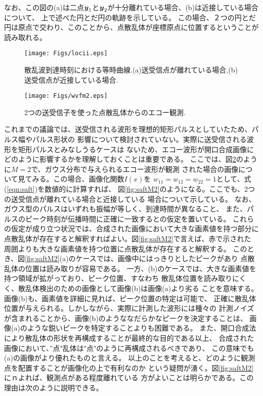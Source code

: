 \documentclass[10pt,a4j,dvipdfmx]{jarticle}
\begin{document}
なお、この図の(a)は二点$\mbox{\boldmath $y$}_1$と$\mbox{\boldmath $y$}_2$が十分離れている場合、(b)は近接している場合について、
上で述べた円とだ円の軌跡を示している。
この場合、２つの円とだ円は原点で交わり、このことから、点散乱体が座標原点に位置するということが読み取れる。
\begin{figure}[h]
	\begin{center}
	\texttt{[image: Figs/locii.eps]} 
	\end{center}
	\caption{散乱波到達時刻における等時曲線.(a)送受信点が離れている場合,(b)送受信点が近接している場合.} 
	\label{fig:locii}
\end{figure}
\begin{figure}[h]
	\begin{center}
	\texttt{[image: Figs/wvfm2.eps]} 
	\end{center}
	\caption{2つの送受信子を使った点散乱体からのエコー観測.} 
	\label{fig:wvfm2}
\end{figure}
これまでの議論では、送受信される波形を理想的矩形パルスとしていたため、パルス幅やパルス形状の
影響について検討されていない。実際に送受信される波形を矩形パルスとみなしうるケースは
ないため、エコー波形が開口合成画像にどのように影響するかを理解しておくことは重要である。
ここでは、図\ref{fig:wvfm2}のように$M=2$で、ガウス分布で与えられるエコー波形が観測
された場合の画像について見てみる。この場合、画像化関数$I(x)$を
$w_{11}=w_{12}=w_{22}=1$として、式(\ref{eqn:saft})を数値的に計算すれば、
図\ref{fig:saftM2}のようになる。ここでも、2つの送受信点が離れている場合と近接している
場合について示している。
なお、ガウス型のパルスはいずれも振幅が等しく、到達時間が異なること、
また、パルスのピーク時刻が伝播時間に正確に一致するとの仮定を置いている。
これらの仮定が成り立つ状況では、合成された画像において大きな画素値を持つ部分に
点散乱体が存在すると解釈すればよい。図\ref{fig:saftM2}で言えば、赤で示された
周囲よりも大きな画素値を持つ位置に点散乱体が存在すると解釈する。
このとき、図\ref{fig:saftM2}(a)のケースでは、画像中にはっきりとしたピークがあり
点散乱体の位置は読み取りが容易である。
一方、(b)のケースでは、大きな画素値を持つ領域が拡がっており、ピーク位置、すなわち
散乱体位置を読み取りにくく、散乱体検出のための画像として画像(b)は画像(a)より劣る
ことを意味する。画像(b)も、画素値を詳細に見れば、ピーク位置の特定は可能で、
正確に散乱体位置が与えられる。しかしながら、実際に計測した波形には種々の
計測ノイズが含まれることから、画像(b)のようななだらかなピークを決定することは、
画像(a)のような鋭いピークを特定することよりも困難である。
また、開口合成法により散乱体の形状を再構成することが最終的な目的である以上、
合成された画像において、”点"乱体は"点"のように再構成されるべきであり、
この意味でも(a)の画像がより優れたものと言える。
以上のことを考えると、どのように観測点を配置することが画像化の上で有利なのか
という疑問が湧く。図\ref{fig:saftM2}にｎよれば、観測点がある程度離れている
方がよいことは明らかである。この理由は次のように説明できる。
\end{document}
